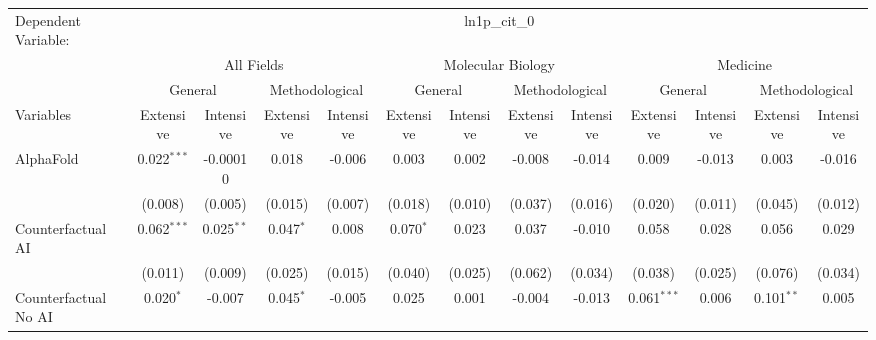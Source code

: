 \begingroup
\centering
\begin{tabular}{lcccccccccccc}
   \tabularnewline \midrule \midrule
   Dependent Variable: & \multicolumn{12}{c}{ln1p\_cit\_0}\\
 & \multicolumn{4}{c}{All Fields} & \multicolumn{4}{c}{Molecular Biology} & \multicolumn{4}{c}{Medicine} \\
\cmidrule(lr){2-5} \cmidrule(lr){6-9} \cmidrule(lr){10-13}
 & \multicolumn{2}{c}{General} & \multicolumn{2}{c}{Methodological} & \multicolumn{2}{c}{General} & \multicolumn{2}{c}{Methodological} & \multicolumn{2}{c}{General} & \multicolumn{2}{c}{Methodological} \\
\cmidrule(lr){2-3} \cmidrule(lr){4-5} \cmidrule(lr){6-7} \cmidrule(lr){8-9} \cmidrule(lr){10-11} \cmidrule(lr){12-13}
Variables & \multicolumn{1}{c}{Extensive} & \multicolumn{1}{c}{Intensive} & \multicolumn{1}{c}{Extensive} & \multicolumn{1}{c}{Intensive} & \multicolumn{1}{c}{Extensive} & \multicolumn{1}{c}{Intensive} & \multicolumn{1}{c}{Extensive} & \multicolumn{1}{c}{Intensive} & \multicolumn{1}{c}{Extensive} & \multicolumn{1}{c}{Intensive} & \multicolumn{1}{c}{Extensive} & \multicolumn{1}{c}{Intensive} \\
\cmidrule(lr){1-1}\cmidrule(lr){2-2} \cmidrule(lr){3-3} \cmidrule(lr){4-4} \cmidrule(lr){5-5} \cmidrule(lr){6-6} \cmidrule(lr){7-7} \cmidrule(lr){8-8} \cmidrule(lr){9-9} \cmidrule(lr){10-10} \cmidrule(lr){11-11} \cmidrule(lr){12-12} \cmidrule(lr){13-13}
   AlphaFold                                & 0.022$^{***}$ & -0.00010     & 0.018       & -0.006  & 0.003        & 0.002          & -0.008  & -0.014        & 0.009         & -0.013        & 0.003        & -0.016\\   
                                            & (0.008)       & (0.005)      & (0.015)     & (0.007) & (0.018)      & (0.010)        & (0.037) & (0.016)       & (0.020)       & (0.011)       & (0.045)      & (0.012)\\   
   Counterfactual AI                        & 0.062$^{***}$ & 0.025$^{**}$ & 0.047$^{*}$ & 0.008   & 0.070$^{*}$  & 0.023          & 0.037   & -0.010        & 0.058         & 0.028         & 0.056        & 0.029\\   
                                            & (0.011)       & (0.009)      & (0.025)     & (0.015) & (0.040)      & (0.025)        & (0.062) & (0.034)       & (0.038)       & (0.025)       & (0.076)      & (0.034)\\   
   Counterfactual No AI                     & 0.020$^{*}$   & -0.007       & 0.045$^{*}$ & -0.005  & 0.025        & 0.001          & -0.004  & -0.013        & 0.061$^{***}$ & 0.006         & 0.101$^{**}$ & 0.005\\   

\end{tabular}

